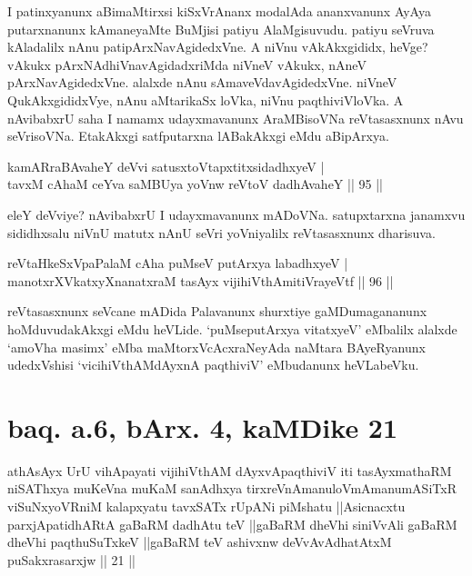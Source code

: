 I patinxyanunx aBimaMtirxsi kiSxVrAnanx modalAda ananxvanunx AyAya 
putarxnanunx kAmaneyaMte BuMjisi patiyu AlaMgisuvudu. patiyu seVruva 
kAladalilx nAnu patipArxNavAgidedxVne. A niVnu vAkAkxgididx, heVge? 
vAkukx pArxNAdhiVnavAgidadxriMda niVneV vAkukx, nAneV 
pArxNavAgidedxVne. alalxde nAnu sAmaveVdavAgidedxVne. niVneV 
QukAkxgididxVye, nAnu aMtarikaSx loVka, niVnu paqthiviVloVka. A 
nAvibabxrU saha I namamx udayxmavanunx AraMBisoVNa reVtasasxnunx nAvu 
seVrisoVNa. EtakAkxgi satfputarxna lABakAkxgi eMdu aBipArxya.

\begin{shl}
kamAR\s \s raBAvaheY deVvi satusxtoVtapxtitxsidadhxyeV | \\
tavxM cAhaM ceYva saMBUya yoVnw reVtoV dadhAvaheY \hfill|| 95 || 
\end{shl}
	
\begin{artha}
eleY deVviye? nAvibabxrU I udayxmavanunx mADoVNa. satupxtarxna 
janamxvu sididhxsalu niVnU matutx nAnU seVri yoVniyalilx reVtasasxnunx 
dharisuva.
\end{artha}

\begin{shl}
reVtaHkeSxVpaPalaM cA\s \s ha puMseV putArxya labadhxyeV | \\
manotxrXVkatxyXnanatxraM tasAyx vijihiVthAmitiVrayeVtf \hfill|| 96 || 
\end{shl}

\begin{artha}
reVtasasxnunx seVcane mADida Palavanunx shurxtiye gaMDumagananunx 
hoMduvudakAkxgi eMdu heVLide. `puMseputArxya vitatxyeV' eMbalilx 
alalxde `amoV\s ha masimx' eMba maMtorxVcAcxraNeyAda naMtara 
BAyeRyanunx udedxVshisi `vicihiVthAMdAyxnA paqthiviV' eMbudanunx 
heVLabeVku.
\end{artha}

\section*{baq. a.6, bArx. 4, kaMDike 21}

\begin{shl}
athAsAyx UrU vihApayati vijihiVthAM dAyxvApaqthiviV iti tasAyxmathaRM niSAThxya muKeVna muKaM sanAdhxya tirxreVnAmanuloVmAmanumASiTxR viSuNxyoVRniM kalapxyatu tavxSATx rUpANi piMshatu ||Asicnacxtu parxjApatidhARtA gaBaRM dadhAtu teV ||gaBaRM dheVhi siniVvAli gaBaRM dheVhi paqthuSuTxkeV ||gaBaRM teV ashivxnw deVvAvAdhatAtxM puSakxrasarxjw || 21 ||
\end{shl}

